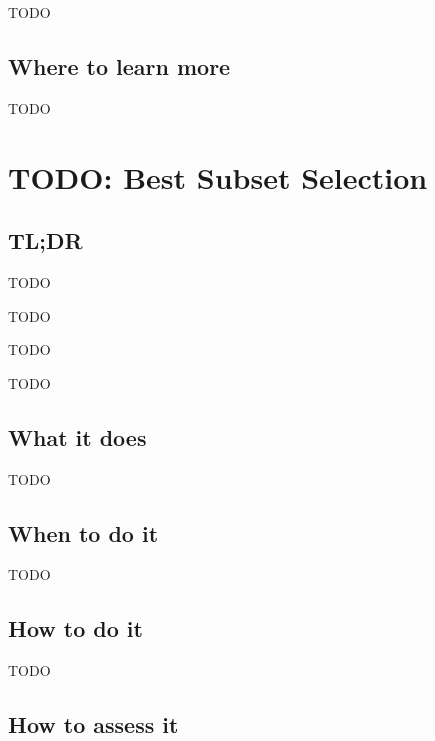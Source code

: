 \documentclass[
]{book}
\providecommand{\tightlist}{%
  \setlength{\itemsep}{0pt}\setlength{\parskip}{0pt}}
\begin{document}
TODO

\hypertarget{where-to-learn-more-10}{%
\section{Where to learn more}\label{where-to-learn-more-10}}

TODO

\hypertarget{best-subset-selection}{%
\chapter{TODO: Best Subset Selection}\label{best-subset-selection}}

\hypertarget{tldr-11}{%
\section{TL;DR}\label{tldr-11}}

\begin{description}
\tightlist
\item[What it does]
TODO
\item[When to do it]
TODO
\item[How to do it]
TODO
\item[How to assess it]
TODO
\end{description}

\hypertarget{what-it-does-11}{%
\section{What it does}\label{what-it-does-11}}

TODO

\hypertarget{when-to-do-it-11}{%
\section{When to do it}\label{when-to-do-it-11}}

TODO

\hypertarget{how-to-do-it-11}{%
\section{How to do it}\label{how-to-do-it-11}}

TODO

\hypertarget{how-to-assess-it-11}{%
\section{How to assess it}\label{how-to-assess-it-11}}
\end{document}

